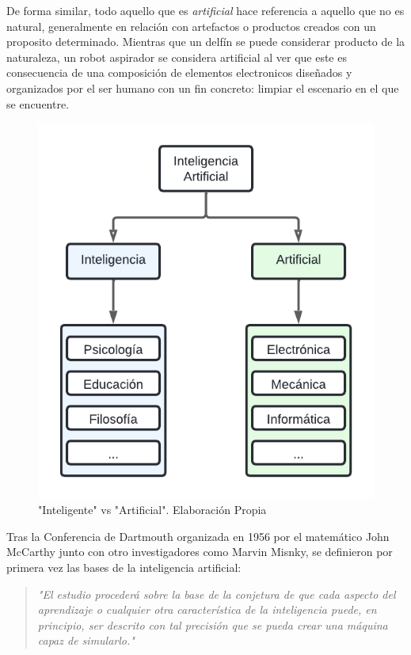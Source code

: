 De forma similar, todo aquello que es \emph{artificial} hace referencia a
aquello que no es natural, generalmente en relación con artefactos o productos
creados con un proposito determinado. Mientras que un delfín se puede considerar
producto de la naturaleza, un robot aspirador se considera artificial al ver que
este es consecuencia de una composición de elementos electronicos diseñados y
organizados por el ser humano con un fin concreto: limpiar el escenario en el
que se encuentre.

\begin{figure}[t]
	\centering
	\includegraphics[scale=0.8, trim=0.5cm 0.5cm 0.5cm 0.5cm]{figs/artificial-vs-intelligence.png}
	\caption{\small"Inteligente" vs "Artificial". Elaboración Propia}
	\label{fig:etiqueta}
\end{figure}

Tras la Conferencia de Dartmouth organizada en 1956 por el matemático John McCarthy
junto con otro investigadores como Marvin Misnky, se definieron por primera vez las
bases de la inteligencia artificial:

\begin{quote}
	\textit{
		"El estudio procederá sobre la base de la conjetura de que cada aspecto
		del aprendizaje o cualquier otra característica de la inteligencia
		puede, en principio, ser descrito con tal precisión que se pueda crear
		una máquina capaz de simularlo." \citet{mccarthy2006proposal}
	}
\end{quote}

